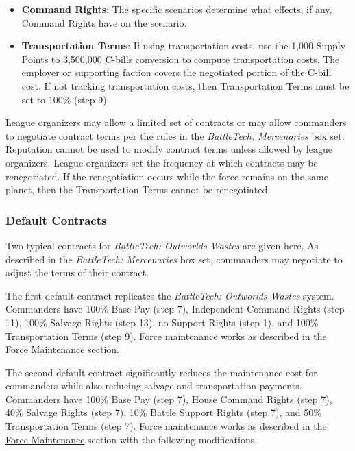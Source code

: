 \begin{itemize}
\item {\bfseries Command Rights}: The specific scenarios determine what effects, if any, Command Rights have on the scenario.

\item {\bfseries Transportation Terms}: If using transportation costs, use the 1,000 Supply Points to 3,500,000 C-bills conversion to compute transportation costs.
The employer or supporting faction covers the negotiated portion of the C-bill cost.
If not tracking transportation costs, then Transportation Terms must be set to 100\% (step 9).

\end{itemize}

League organizers may allow a limited set of contracts or may allow commanders to negotiate contract terms per the rules in the \emph{BattleTech: Mercenaries} box set.
Reputation cannot be used to modify contract terms unless allowed by league organizers.
League organizers set the frequency at which contracts may be renegotiated.
If the renegotiation occurs while the force remains on the same planet, then the Transportation Terms cannot be renegotiated.

\subsubsection{Default Contracts}

Two typical contracts for \emph{BattleTech: Outworlds Wastes} are given here.
As described in the \emph{BattleTech: Mercenaries} box set, commanders may negotiate to adjust the terms of their contract.

The first default contract replicates the \emph{BattleTech: Outworlds Wastes} system.
Commanders have 100\% Base Pay (step 7), Independent Command Rights (step 11), 100\% Salvage Rights (step 13), no Support Rights (step 1), and 100\% Transportation Terms (step 9).
Force maintenance works as described in the \hyperref[subsec:force_maintenance]{Force Maintenance} section.

The second default contract significantly reduces the maintenance cost for commanders while also reducing salvage and transportation payments.
Commanders have 100\% Base Pay (step 7), House Command Rights (step 7), 40\% Salvage Rights (step 7), 10\% Battle Support Rights (step 7), and 50\% Transportation Terms (step 7).
Force maintenance works as described in the \hyperref[subsec:force_maintenance]{Force Maintenance} section with the following modifications.

